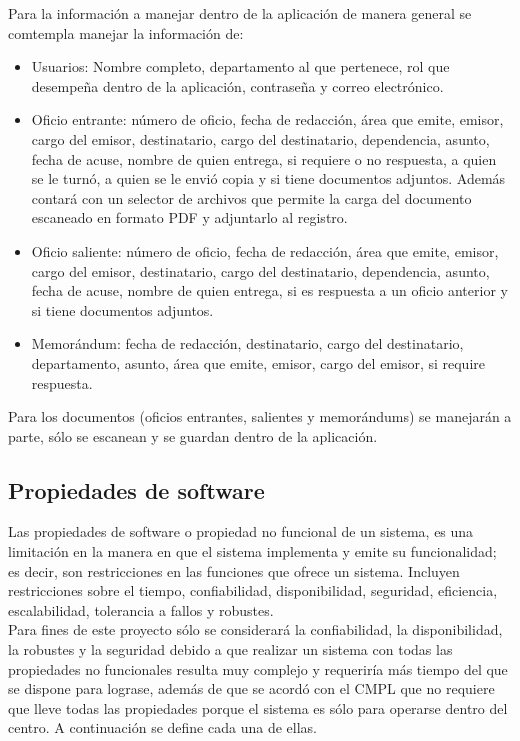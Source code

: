 Para la información a manejar dentro de la aplicación de manera general se comtempla manejar la información de:
\begin{itemize}
	\item Usuarios: Nombre completo, departamento al que pertenece, rol que desempeña dentro de la aplicación, contraseña y correo electrónico.
	\item Oficio entrante: número de oficio, fecha de redacción, área que emite, emisor, cargo del emisor, destinatario, cargo del destinatario, dependencia, asunto, fecha de acuse, nombre de quien entrega, si requiere o no respuesta, a quien se le turnó, a quien se le envió copia y si tiene documentos adjuntos. Además contará con un selector de archivos que permite la carga del documento escaneado en formato PDF y adjuntarlo al registro.
	\item Oficio saliente: número de oficio, fecha de redacción, área que emite, emisor, cargo del emisor, destinatario, cargo del destinatario, dependencia, asunto, fecha de acuse, nombre de quien entrega, si es respuesta a un oficio anterior y si tiene documentos adjuntos.
	\item Memorándum: fecha de redacción, destinatario, cargo del destinatario, departamento, asunto, área que emite, emisor, cargo del emisor, si require respuesta. 
\end{itemize}

Para los documentos (oficios entrantes, salientes y memorándums) se manejarán a parte, sólo se escanean y se guardan dentro de la aplicación. 

\subsection{Propiedades de software}

Las propiedades de software o propiedad no funcional de un sistema, es una limitación en la manera en que el sistema implementa y emite su funcionalidad; es decir, son restricciones en las funciones que ofrece un sistema. Incluyen restricciones sobre el tiempo, confiabilidad, disponibilidad, seguridad, eficiencia, escalabilidad, tolerancia a fallos y robustes. \\

Para fines de este proyecto sólo se considerará la confiabilidad, la disponibilidad, la robustes y la seguridad debido a que realizar un sistema con todas las propiedades no funcionales resulta muy complejo y requeriría más tiempo del que se dispone para lograse, además de que se acordó con el CMPL que no requiere que lleve todas las propiedades porque el sistema es sólo para operarse dentro del centro. A continuación se define cada una de ellas. \\ %


